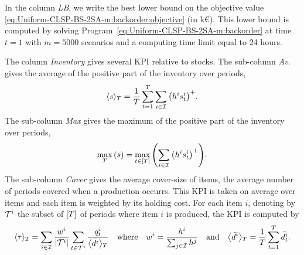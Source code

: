 In the column \emph{LB}, we write the best lower bound on the objective value \eqref{eq:Uniform-CLSP-BS-2SA-m:backorder:objective} (in k\euro{}).
This lower bound is computed by solving Program~\eqref{eq:Uniform-CLSP-BS-2SA-m:backorder} at time $t=1$ with $m=5000$ scenarios and a computing time limit equal to 24 hours.


The column \emph{Inventory} gives several KPI relative to stocks.
The sub-column \emph{Av.} gives the average of the positive part of the inventory over periods, \ie
\begin{equation}
  \left<\inventory\right>_{\horizon} = \frac{1}{\horizon}\sum_{t=1}^{\horizon}\sum_{i\in\REF} \bracket{\holding^i\inventory_t^i}^+.
\end{equation}
The sub-column \emph{Max} gives the maximum of the positive part of the inventory over periods, \ie
\begin{equation}
  \max_{\horizon}\bracket{\inventory} = \max_{t\in\range{\horizon}}\bracket{\sum_{i\in\REF} \bracket{\holding^i\inventory_t^i}^+}.
\end{equation}
The sub-column \emph{Cover} gives the average cover-size of items, \ie the average number of periods covered when a production occurrs.
This KPI is taken on average over items and each item is weighted by its holding cost.
For each item $i$, denoting by $\mathcal{T}^i$ the subset of $\range{\horizon}$ of periods where item $i$ is produced, the KPI is computed by
\begin{equation}\label{eq:pdp:numerical-experiments:KPI:cover}
  \left<\cover\right>_{\REF}
  = \sum_{i\in\REF} \frac{w^i}{\card{\cT^i}}\sum_{t\in\cT^i} \frac{\quantity_t^i}{\left<\bar{\demand}^i\right>_{\horizon}}
  \quad\mbox{where}\quad
  w^i=\frac{\holding^i}{\sum_{j\in\REF}\holding^j}
  \quad\mbox{and}\quad
  \left<\bar{\demand}^i\right>_{\horizon}=\frac{1}{\horizon}\sum_{t=1}^{\horizon} \bar{\demand_t^i}.
\end{equation}


